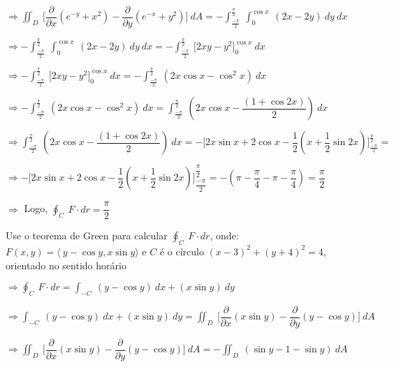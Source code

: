 \documentclass[11pt,a4paper]{article}
\begin{document}
\begin{enumerate}
{		$\Rightarrow \displaystyle\iint_D\ \Bigg[\dfrac{\partial}{\partial x}(e^{-y} + x^2) - \dfrac{\partial}{\partial y}(e^{-x} + y^2)\Bigg]\ dA = -\displaystyle\int_{\frac{-\pi}{2}}^{\frac{\pi}{2}}\ \displaystyle\int_{0}^{\cos x}\ (2x - 2y)\ dy\ dx$
		
		$\Rightarrow -\displaystyle\int_{\frac{-\pi}{2}}^{\frac{\pi}{2}}\ \displaystyle\int_{0}^{\cos x}\ (2x - 2y)\ dy\ dx = -\displaystyle\int_{\frac{-\pi}{2}}^{\frac{\pi}{2}}\ \Big[2xy - y^2\Big]_0^{\cos x}\ dx $
		
		$\Rightarrow -\displaystyle\int_{\frac{-\pi}{2}}^{\frac{\pi}{2}}\ \Big[2xy - y^2\Big]_0^{\cos x}\ dx = -\displaystyle\int_{\frac{-\pi}{2}}^{\frac{\pi}{2}}\ (2x \cos x - \cos^2x)\ dx $
		
		$\Rightarrow -\displaystyle\int_{\frac{-\pi}{2}}^{\frac{\pi}{2}}\ (2x \cos x - \cos^2x)\ dx = \displaystyle\int_{\frac{-\pi}{2}}^{\frac{\pi}{2}}\ (2x\cos x - \dfrac{(1 + \cos2x)}{2})\ dx$
		
		$\Rightarrow \displaystyle\int_{\frac{-\pi}{2}}^{\frac{\pi}{2}}\ (2x\cos x - \dfrac{(1 + \cos2x)}{2})\ dx = - \Bigg[2x\sin x + 2\cos x - \dfrac{1}{2}(x + \dfrac{1}{2}\sin 2x)\Bigg]_{\frac{-\pi}{2}}^{\frac{\pi}{2}} = $
		
		$\Rightarrow - \Bigg[2x\sin x + 2\cos x - \dfrac{1}{2}(x + \dfrac{1}{2}\sin 2x)\Bigg]_{\dfrac{-\pi}{2}}^{\dfrac{\pi}{2}} = - (\pi - \dfrac{\pi}{4} - \pi - \dfrac{\pi}{4}) = \dfrac{\pi}{2}$
		
		$\Rightarrow$ Logo, $\displaystyle\oint_C\ F \cdot dr = \dfrac{\pi}{2}$
		
		\item Use o teorema de Green para calcular $\displaystyle\oint_C\ F \cdot dr$, onde: $F(x,y) = \langle\ y - \cos y, x \sin y\rangle $ e $C$ é o círculo $(x - 3)^2 + (y + 4)^2 = 4$, orientado no sentido horário
		
		$\Rightarrow \displaystyle\oint_C\ F \cdot dr = \displaystyle\int_{-C}\ (y - \cos y)\ dx + (x \sin y)\ dy $
		
		$\Rightarrow \displaystyle\int_{-C}\ (y - \cos y)\ dx + (x \sin y)\ dy = \displaystyle\iint_D\ \Bigg[\dfrac{\partial}{\partial x}(x \sin y) - \dfrac{\partial}{\partial y}(y - \cos y)\Bigg]\ dA$
		
		$\Rightarrow \displaystyle\iint_D\ \Bigg[\dfrac{\partial}{\partial x}(x \sin y) - \dfrac{\partial}{\partial y}(y - \cos y)\Bigg]\ dA = -\displaystyle\iint_D\ (\sin y -1 - \sin y)\ dA $  
		
}
\end{enumerate}
\end{document}

